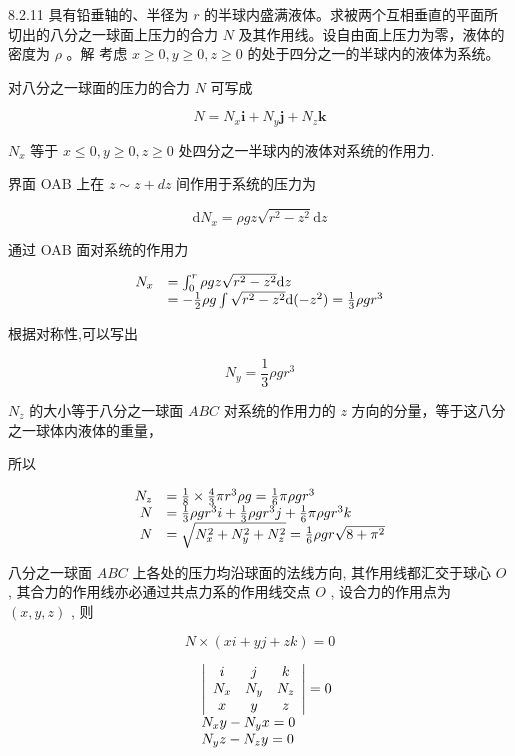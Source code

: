 \begin{problem}{8.2.11}
具有铅垂轴的、半径为 $r$ 的半球内盛满液体。求被两个互相垂直的平面所切出的八分之一球面上压力的合力 $N$ 及其作用线。设自由面上压力为零，液体的密度为 $\rho$ 。解 考虑 $x \geqslant 0, y \geqslant 0, z \geqslant 0$ 的处于四分之一的半球内的液体为系统。

对八分之一球面的压力的合力 $N$ 可写成

\[
N = N _ {x} \boldsymbol {i} + N _ {y} \boldsymbol {j} + N _ {z} \boldsymbol {k}
\]

$N_{x}$ 等于 $x \leqslant 0, y \geqslant 0, z \geqslant 0$ 处四分之一半球内的液体对系统的作用力.

界面 OAB 上在 $z \sim z + dz$ 间作用于系统的压力为

\[
\mathrm{d} N _ {x} = \rho g z \sqrt {r ^ {2} - z ^ {2}} \mathrm{d} z
\]

通过 OAB 面对系统的作用力

\[
\begin{array}{r l} N _ {x} & = \int_ {0} ^ {r} \rho g z \sqrt {r ^ {2} - z ^ {2}} \mathrm{d} z \\ & = - \frac {1}{2} \rho g \int \sqrt {r ^ {2} - z ^ {2}} \mathrm{d} (- z ^ {2}) = \frac {1}{3} \rho g r ^ {3} \end{array}
\]

根据对称性,可以写出

\[
N _ {y} = \frac {1}{3} \rho g r ^ {3}
\]

$N_{z}$ 的大小等于八分之一球面 $ABC$ 对系统的作用力的 $z$ 方向的分量，等于这八分之一球体内液体的重量，

所以

\[
\begin{array}{r l} N _ {z} & = \frac {1}{8} \times \frac {4}{3} \pi r ^ {3} \rho g = \frac {1}{6} \pi \rho g r ^ {3} \\ N & = \frac {1}{3} \rho g r ^ {3} i + \frac {1}{3} \rho g r ^ {3} j + \frac {1}{6} \pi \rho g r ^ {3} k \\ N & = \sqrt {N _ {x} ^ {2} + N _ {y} ^ {2} + N _ {z} ^ {2}} = \frac {1}{6} \rho g r \sqrt {8 + \pi^ {2}} \end{array}
\]

八分之一球面 $ABC$ 上各处的压力均沿球面的法线方向, 其作用线都汇交于球心 $O$ , 其合力的作用线亦必通过共点力系的作用线交点 $O$ , 设合力的作用点为 $(x, y, z)$ , 则

\[
N \times (x i + y j + z k) = 0
\]

\[
\begin{array}{r l} & {\left| \begin{array}{c c c} i & j & k \\ N _ {x} & N _ {y} & N _ {z} \\ x & y & z \end{array} \right| = 0} \\ & {N _ {x} y - N _ {y} x = 0} \\ & {N _ {y} z - N _ {z} y = 0} \end{array}
\]


\end{problem}
